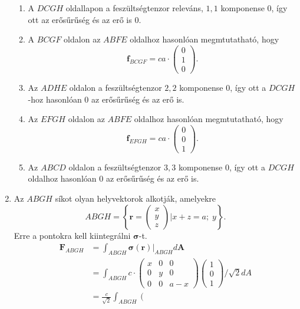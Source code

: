 \documentclass[12pt,a4paper]{scrartcl}
\let\mathbf\bm
\begin{document}
\begin{enumerate}
\begin{enumerate}
\item A $DCGH$ oldallapon a feszültségtenzor releváns, $1,1$ komponense 0, így ott az erősűrűség és az erő is 0.
\item A $BCGF$ oldalon az $ABFE$ oldalhoz hasonlóan megmtutatható, hogy 
\[{{\mathbf{f}}_{BCGF}} = ca \cdot \left( {\begin{array}{*{20}{c}}
  0 \\ 
  1 \\ 
  0 
\end{array}} \right).\]
\item Az $ADHE$ oldalon a feszültségtenzor $2,2$ komponense 0, így ott a $DCGH$-hoz hasonlóan 0 az erősűrűség és az erő is.
\item Az $EFGH$ oldalon az $ABFE$ oldalhoz hasonlóan megmtutatható, hogy 
\[{{\mathbf{f}}_{EFGH}} = ca \cdot \left( {\begin{array}{*{20}{c}}
  0 \\ 
  0 \\ 
  1 
\end{array}} \right).\]
\item Az $ABCD$ oldalon a feszültségtenzor $3,3$ komponense 0, így ott a $DCGH$ oldalhoz hasonlóan 0 az erősűrűség és az erő is.
\end{enumerate}
\item Az $ABGH$ síkot olyan helyvektorok alkotják, amelyekre \[ABGH = \left\{ {{\mathbf{r}} = \left( {\begin{array}{*{20}{c}}
  x \\ 
  y \\ 
  z 
\end{array}} \right)|x + z = a;\;y} \right\}.\]
Erre a pontokra kell kiintegrálni ${\mathbf{\sigma }}$-t.
\[\begin{aligned}
  {{\mathbf{F}}_{ABGH}} &  = \int_{ABGH} {{{\left. {{\mathbf{\sigma }}\left( {\mathbf{r}} \right)} \right|}_{ABGH}}} d{\mathbf{A}} \\ 
   &  = \int_{ABGH} {c \cdot \left( {\begin{array}{*{20}{c}}
  x&0&0 \\ 
  0&y&0 \\ 
  0&0&{a - x} 
\end{array}} \right)} \left( {\begin{array}{*{20}{c}}
  1 \\ 
  0 \\ 
  1 
\end{array}} \right)/\sqrt 2 dA \\ 
   &  = \frac{c}{{\sqrt 2 }}\int_{ABGH} {\left( {\begin{array}{*{20}{c}}

\end{array}}}
\end{aligned}\]
\end{enumerate}
\end{document}
